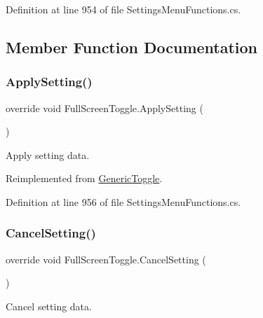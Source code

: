 Definition at line 954 of file Settings\+Menu\+Functions.\+cs.



\subsection{Member Function Documentation}
\mbox{\label{class_full_screen_toggle_ae4c6b14c9e106e2d2749b28808a9bd6c}} 
\subsubsection{\texorpdfstring{Apply\+Setting()}{ApplySetting()}}
{\footnotesize\ttfamily override void Full\+Screen\+Toggle.\+Apply\+Setting (\begin{DoxyParamCaption}{ }\end{DoxyParamCaption})\hspace{0.3cm}{\ttfamily [virtual]}}



Apply setting data. 



Reimplemented from \hyperlink{class_generic_toggle_af184e77b892617775fd0785fad7e750a}{Generic\+Toggle}.



Definition at line 956 of file Settings\+Menu\+Functions.\+cs.

\mbox{\label{class_full_screen_toggle_a6f9140dc1331393df37ad10944831eae}} 
\subsubsection{\texorpdfstring{Cancel\+Setting()}{CancelSetting()}}
{\footnotesize\ttfamily override void Full\+Screen\+Toggle.\+Cancel\+Setting (\begin{DoxyParamCaption}{ }\end{DoxyParamCaption})\hspace{0.3cm}{\ttfamily [virtual]}}



Cancel setting data. 




